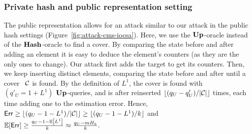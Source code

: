 \subsubsection{Private hash and public representation setting}
The public representation allows for an attack similar to our attack in the public hash settings (Figure~\ref{fig:attack-cms-iocsa}). Here, we use the $\textup{\textbf{Up}}\hspace{0.5pt}$-oracle instead of the $\textup{\textbf{Hash}}\hspace{0.5pt}$-oracle to find a cover. By comparing the state before and after adding an element 
it is easy to deduce the element's counters (as they are the only ones to change).
Our attack first adds the target to get its counters. Then, we keep inserting distinct elements, comparing the state before and after until a cover ~$\mathcal{C}$ is found.
By the definition of $L^1$, the cover is found with $(q'_U  = 1+ L^1)$ $\textup{\textbf{Up}}\hspace{0.5pt}$-queries, and is after reinserted $\lfloor (q_U - q_U')/|\mathcal{C}| \rfloor$ times, each time adding one to the estimation error. Hence, 
$\mathsf{Err} \geq \lfloor (q_U - 1 - L^1)/|\mathcal{C}|\rfloor \geq \lfloor (q_U -1 - L^1)/k \rfloor$  and
$\mathbb{E}[\mathsf{Err}] \geq \frac{q_U-1-\mathbb{E}\left[L^1\right]}{k} \approx \frac{q_U - mH_k}{k}.$
